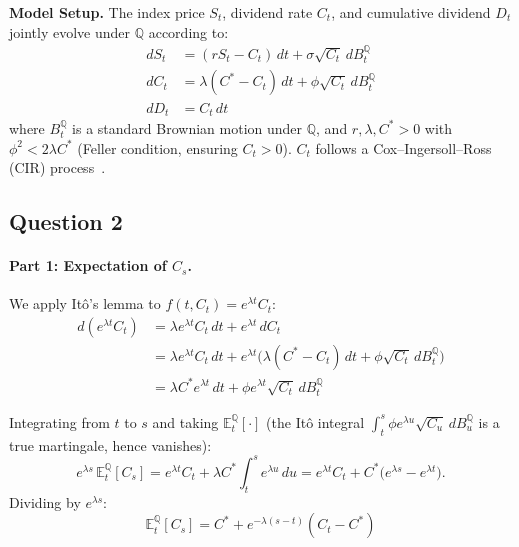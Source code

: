 \documentclass[12pt,a4paper]{article}
\begin{document}
\vspace{0.3cm}
\noindent \textbf{Model Setup.} The index price $S_t$, dividend rate $C_t$, and cumulative dividend $D_t$ jointly evolve under $\mathbb{Q}$ according to:
\begin{equation} \label{eq:model}
\begin{aligned}
    dS_t &= (rS_t - C_t)\,dt + \sigma \sqrt{C_t}\,dB^\mathbb{Q}_t \\
    dC_t &= \lambda(C^* - C_t)\,dt + \phi \sqrt{C_t}\,dB^\mathbb{Q}_t \\
    dD_t &= C_t\,dt
\end{aligned}
\end{equation}
where $B^\mathbb{Q}_t$ is a standard Brownian motion under $\mathbb{Q}$, and $r, \lambda, C^* > 0$ with $\phi^2 < 2\lambda C^*$ (Feller condition, ensuring $C_t > 0$). $C_t$ follows a Cox–Ingersoll–Ross (CIR) process~\cite{cir}.

\subsection*{Question 2}

\paragraph{Part 1: Expectation of $C_s$.}
We apply Itô's lemma to $f(t, C_t) = e^{\lambda t} C_t$:
\begin{align*}
    d(e^{\lambda t} C_t) &= \lambda e^{\lambda t} C_t\,dt + e^{\lambda t}\,dC_t \\
    &= \lambda e^{\lambda t} C_t\,dt + e^{\lambda t} \big(\lambda(C^* - C_t)\,dt + \phi \sqrt{C_t}\,dB^\mathbb{Q}_t\big) \\
    &= \lambda C^* e^{\lambda t}\,dt + \phi e^{\lambda t} \sqrt{C_t}\,dB^\mathbb{Q}_t
\end{align*}

Integrating from $t$ to $s$ and taking $\mathbb{E}_t^\mathbb{Q}[\cdot]$ (the Itô integral $\int_t^s \phi e^{\lambda u}\sqrt{C_u}\,dB_u^\mathbb{Q}$ is a true martingale, hence vanishes):
\begin{equation*}
    e^{\lambda s}\,\mathbb{E}_t^\mathbb{Q}[C_s] = e^{\lambda t} C_t + \lambda C^* \int_t^s e^{\lambda u}\,du = e^{\lambda t} C_t + C^*\big(e^{\lambda s} - e^{\lambda t}\big).
\end{equation*}
Dividing by $e^{\lambda s}$:
\begin{equation}
    \boxed{\,\mathbb{E}_t^\mathbb{Q}[C_s] = C^* + e^{-\lambda(s-t)}(C_t - C^*)\,} \label{eq:expected_C}
\end{equation}
\end{document}
